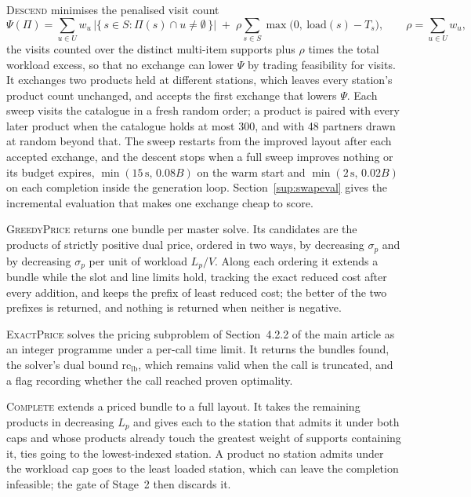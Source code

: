 \documentclass[11pt]{article}
\begin{document}
\textsc{Descend} minimises the penalised visit count
\[
\Psi(\Pi)=\sum_{u \in U} w_u\,\bigl\lvert\{\,s \in S : \Pi(s) \cap u \neq \emptyset\,\}\bigr\rvert
\;+\; \rho \sum_{s \in S} \max\bigl(0,\ \mathrm{load}(s) - T_s\bigr),
\qquad \rho=\sum_{u\in U} w_u,
\]
the visits counted over the distinct multi-item supports plus $\rho$ times the total workload
excess, so that no exchange can lower $\Psi$ by trading feasibility for visits. It exchanges two
products held at different stations, which leaves every station's product count unchanged, and
accepts the first exchange that lowers $\Psi$. Each sweep visits the catalogue in a fresh random
order; a product is paired with every later product when the catalogue holds at most 300, and with
48 partners drawn at random beyond that. The sweep restarts from the improved layout after each
accepted exchange, and the descent stops when a full sweep improves nothing or its budget expires,
$\min(15\,\mathrm{s},\,0.08B)$ on the warm start and $\min(2\,\mathrm{s},\,0.02B)$ on each
completion inside the generation loop. Section~\ref{sup:swapeval} gives the incremental evaluation
that makes one exchange cheap to score.

\textsc{GreedyPrice} returns one bundle per master solve. Its candidates are the products of
strictly positive dual price, ordered in two ways, by decreasing $\sigma_p$ and by decreasing
$\sigma_p$ per unit of workload $L_p/V$. Along each ordering it extends a bundle while the slot and
line limits hold, tracking the exact reduced cost after every addition, and keeps the prefix of
least reduced cost; the better of the two prefixes is returned, and nothing is returned when
neither is negative.

\textsc{ExactPrice} solves the pricing subproblem of Section~4.2.2 of the main article as an
integer programme under a per-call time limit. It returns the bundles found, the solver's dual
bound $\mathrm{rc}_{\mathrm{lb}}$, which remains valid when the call is truncated, and a flag
recording whether the call reached proven optimality.

\textsc{Complete} extends a priced bundle to a full layout. It takes the remaining products in
decreasing $L_p$ and gives each to the station that admits it under both caps and whose products
already touch the greatest weight of supports containing it, ties going to the lowest-indexed
station. A product no station admits under the workload cap goes to the least loaded station,
which can leave the completion infeasible; the gate of Stage~2 then discards it.
\end{document}
